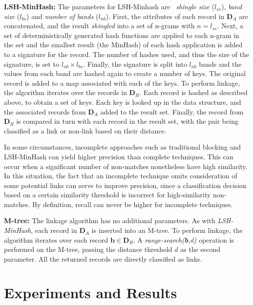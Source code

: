 \documentclass{llncs}
\begin{document}
\textbf{LSH-MinHash:}
The parameters for LSH-Minhash are~\cite{Broder1997} \emph{shingle
size} ($l_{ss}$), \emph{band size} ($l_{bs}$) and \emph{number of
bands} ($l_{nb}$). First, the attributes of each record in $\mathbf{D}_A$
are concatenated, and the result \emph{shingled} into a set of
n-grams with $n = l_{ss}$. Next, a set of deterministically generated
hash functions are applied to each n-gram in the set and the smallest
result (the MinHash) of each hash application is added to a signature
for the record. The number of hashes used, and thus the size of the
signature, is set to $l_{nb} \times l_{bs}$. Finally, the signature is
split into $l_{nb}$ bands and the values from each band are hashed
again to create a number of keys. The original record is added to a
map associated with each of the keys. 
To perform linkage, the algorithm iterates over the records in
$\mathbf{D}_B$. Each record is hashed as described
above, to obtain a set of keys. Each key is
looked up in the data structure, and the associated records from
$\mathbf{D}_A$ added to the result set. Finally,
the record from $\mathbf{D}_B$ is compared in turn with each record
in the result set, with the pair being classified as a link
or non-link based on their distance.

In some circumstances, incomplete approaches such as traditional
blocking and LSH-MinHash can yield higher precision than complete
techniques. This can occur when a significant
number of non-matches nonetheless have high similarity. In this
situation, the fact that an incomplete technique omits consideration
of some potential links can serve to improve precision, since a
classification decision based on a certain similarity threshold is
incorrect for high-similarity non-matches. By definition, recall can
never be higher for incomplete techniques.

\textbf{M-tree:} The linkage
algorithm has no additional parameters. As with
\emph{LSH-MinHash}, each record in $\mathbf{D}_A$ is inserted
into an M-tree. To perform linkage, the algorithm iterates over each
record $\mathbf{b} \in \mathbf{D}_B$. A
\emph{range-search(\textbf{b},d)} operation is performed on the M-tree,
passing the distance threshold $d$ as the second parameter. All the
returned records are directly classified as links.


\section{Experiments and Results}
\label{sec-exp}
\end{document}
